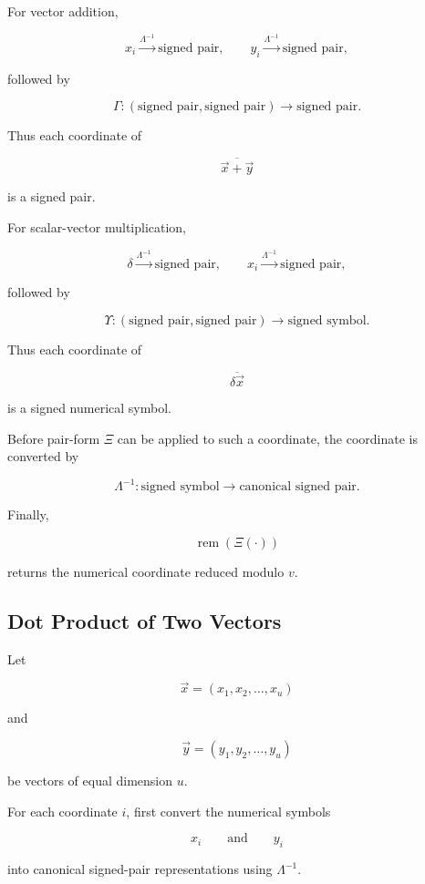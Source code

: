\documentclass[12pt]{article}
\begin{document}
For vector addition,

\[
\boxed{
x_i
\overset{\Lambda^{-1}}{\longrightarrow}
\text{signed pair},
\qquad
y_i
\overset{\Lambda^{-1}}{\longrightarrow}
\text{signed pair},
}
\]

followed by

\[
\boxed{
\Gamma:
(\text{signed pair},\text{signed pair})
\longrightarrow
\text{signed pair}.
}
\]

Thus each coordinate of

\[
\overline{\vec{x}+\vec{y}}
\]

is a signed pair.

For scalar-vector multiplication,

\[
\boxed{
\delta
\overset{\Lambda^{-1}}{\longrightarrow}
\text{signed pair},
\qquad
x_i
\overset{\Lambda^{-1}}{\longrightarrow}
\text{signed pair},
}
\]

followed by

\[
\boxed{
\Upsilon:
(\text{signed pair},\text{signed pair})
\longrightarrow
\text{signed symbol}.
}
\]

Thus each coordinate of

\[
\overline{\delta\vec{x}}
\]

is a signed numerical symbol.

Before pair-form \(\Xi\) can be applied to such a coordinate, the coordinate is converted by

\[
\boxed{
\Lambda^{-1}:
\text{signed symbol}
\longrightarrow
\text{canonical signed pair}.
}
\]

Finally,

\[
\boxed{
\operatorname{rem}(\Xi(\cdot))
}
\]

returns the numerical coordinate reduced modulo \(v\).
\subsection*{Dot Product of Two Vectors}

Let

\[
\vec{x}
=
(x_1,x_2,\ldots,x_u)
\]

and

\[
\vec{y}
=
(y_1,y_2,\ldots,y_u)
\]

be vectors of equal dimension \(u\).

For each coordinate \(i\), first convert the numerical symbols

\[
x_i
\qquad\text{and}\qquad
y_i
\]

into canonical signed-pair representations using \(\Lambda^{-1}\).
\end{document}
